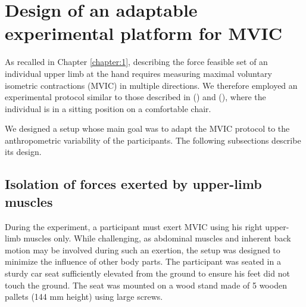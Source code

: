 \section{Design of an adaptable experimental platform for MVIC}
\label{sec:experimental_setup}
As recalled in Chapter \ref{chapter:1}, describing the force feasible set of an individual upper limb at the hand requires measuring maximal voluntary isometric contractions (MVIC) in multiple directions. We therefore employed an experimental protocol similar to those described in (\cite{rezzougUpperLimbIsometricForce2021b}) and (\cite{hernandezIsometricForceCapabilities2015}), where the individual is in a sitting position on a comfortable chair.

We designed a setup whose main goal was to adapt the MVIC protocol to the anthropometric variability of the participants. The following subsections describe its design.

\subsection{Isolation of forces exerted by upper-limb muscles}
During the experiment, a participant must exert MVIC using his right upper-limb muscles only. While challenging, as abdominal muscles and inherent back motion may be involved during such an exertion, the setup was designed to minimize the influence of other body parts. The participant was seated in a sturdy car seat sufficiently elevated from the ground to ensure his feet did not touch the ground. The seat was mounted on a wood stand made of 5 wooden pallets (144 mm height) using large screws.

